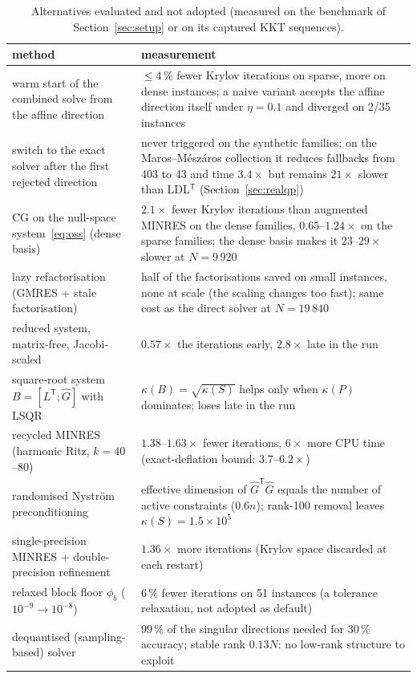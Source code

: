 \documentclass[11pt]{article}
\theoremstyle{definition}
\newcommand{\Ghat}{\hat G}
\newcommand{\T}{^{\mathsf T}}
\begin{document}
\begin{table}[t]\centering\small
\caption{Alternatives evaluated and not adopted (measured on the benchmark of Section~\ref{sec:setup} or on its captured KKT sequences).}\label{tab:notadopted}
\begin{tabularx}{\textwidth}{p{5.2cm}X}\toprule
method & measurement\\\midrule
warm start of the combined solve from the affine direction & $\le4\,\%$ fewer Krylov iterations on sparse, more on dense instances; a naive variant accepts the affine direction itself under $\eta=0.1$ and diverged on 2/35 instances\\
switch to the exact solver after the first rejected direction & never triggered on the synthetic families; on the Maros--M\'esz\'aros collection it reduces fallbacks from 403 to 43 and time $3.4\times$ but remains $21\times$ slower than LDL$\T$ (Section~\ref{sec:realqp})\\
CG on the null-space system~\eqref{eq:oss} (dense basis) & $2.1\times$ fewer Krylov iterations than augmented MINRES on the dense families, $0.65$--$1.24\times$ on the sparse families; the dense basis makes it $23$--$29\times$ slower at $N=9\,920$\\
lazy refactorisation (GMRES + stale factorisation) & half of the factorisations saved on small instances, none at scale (the scaling changes too fast); same cost as the direct solver at $N=19\,840$\\
reduced system, matrix-free, Jacobi-scaled & $0.57\times$ the iterations early, $2.8\times$ late in the run\\
square-root system $B=[L\T;\Ghat]$ with LSQR & $\kappa(B)=\sqrt{\kappa(S)}$ helps only when $\kappa(P)$ dominates; loses late in the run\\
recycled MINRES (harmonic Ritz, $k=40$--$80$) & $1.38$--$1.63\times$ fewer iterations, $6\times$ more CPU time (exact-deflation bound: $3.7$--$6.2\times$)\\
randomised Nystr\"om preconditioning & effective dimension of $\Ghat\T\Ghat$ equals the number of active constraints ($0.6n$); rank-100 removal leaves $\kappa(S)=1.5\times10^{5}$\\
single-precision MINRES + double-precision refinement & $1.36\times$ more iterations (Krylov space discarded at each restart)\\
relaxed block floor $\phi_b$ ($10^{-9}\to10^{-8}$) & $6\,\%$ fewer iterations on 51 instances (a tolerance relaxation, not adopted as default)\\
dequantised (sampling-based) solver~\cite{tang2019dequantize} & $99\,\%$ of the singular directions needed for 30\,\% accuracy; stable rank $0.13N$: no low-rank structure to exploit\\\bottomrule
\end{tabularx}
\end{table}
\end{document}
